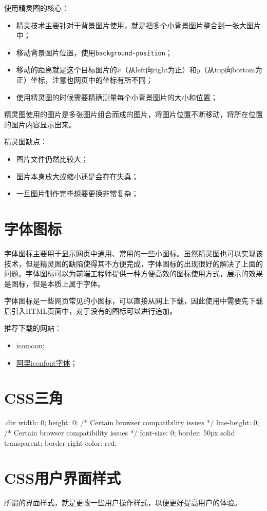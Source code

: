 使用精灵图的核心：
\begin{itemize}
	\item 精灵技术主要针对于背景图片使用，就是把多个小背景图片整合到一张大图片中；
	\item 移动背景图片位置，使用\verb|background-position|；
	\item 移动的距离就是这个目标图片的$x$（从left向right为正）和$y$（从top向bottom为正）坐标，注意也网页中的坐标有所不同；
	\item 使用精灵图的时候需要精确测量每个小背景图片的大小和位置；
\end{itemize}

精灵图使用的图片是多张图片组合而成的图片，将图片位置不断移动，将所在位置的图片内容显示出来。

精灵图缺点：
\begin{itemize}
	\item 图片文件仍然比较大；
	\item 图片本身放大或缩小还是会存在失真；
	\item 一旦图片制作完毕想要更换非常复杂；
\end{itemize}
\section{字体图标}
字体图标主要用于显示网页中通用、常用的一些小图标。虽然精灵图也可以实现该技术，但是精灵图的缺陷使得其不方便完成，字体图标的出现很好的解决了上面的问题。字体图标可以为前端工程师提供一种方便高效的图标使用方式，展示的效果是图标，但是本质上属于字体。

字体图标是一些网页常见的小图标，可以直接从网上下载，因此使用中需要先下载后引入HTML页面中，对于没有的图标可以进行追加。

推荐下载的网站：
\begin{itemize}
	\item \href{http://icomoon.io}{icomoon};
	\item \href{http://www.iconfont.cn/}{阿里iconfont字体}；
\end{itemize}
\section{CSS三角}
\begin{css}
	.div {
	width: 0;
	height: 0;
	/* Certain browser compatibility issues */
	line-height: 0;
	/* Certain browser compatibility issues */
	font-size: 0;
	border: 50px solid transparent;
	border-right-color: red;
	}
\end{css}
\section{CSS用户界面样式}
所谓的界面样式，就是更改一些用户操作样式，以便更好提高用户的体验。

